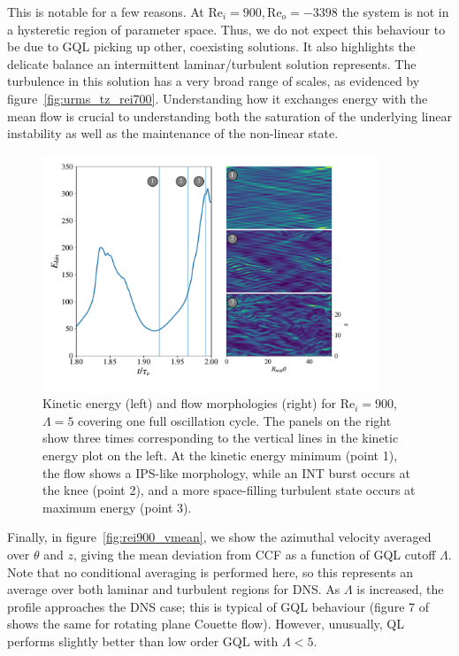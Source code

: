 \documentclass[openacc]{rstransa}%
\newcommand{\Reyn}{\mathrm{Re}}
\begin{document}
This is notable for a few reasons. At $\Reyn_i=900, \Reyn_o=-3398$ the system is not in a hysteretic region of parameter space. Thus, we do not expect this behaviour to be due to GQL picking up other, coexisting solutions. 
It also highlights the delicate balance an intermittent laminar/turbulent solution represents. The turbulence in this solution has a very broad range of scales, as evidenced by figure~\ref{fig:urms_tz_rei700}. Understanding how it exchanges energy with the mean flow is crucial to understanding both the saturation of the underlying linear instability as well as the maintenance of the non-linear state. 
\begin{figure}
    \centering
    \includegraphics[width=0.9\textwidth]{figs/rei900_story.pdf}
    \caption{Kinetic energy (left) and flow morphologies (right) for $\Reyn_i = 900$, $\Lambda = 5$ covering one full oscillation cycle. The panels on the right show three times corresponding to the vertical lines in the kinetic energy plot on the left. At the kinetic energy minimum (point 1), the flow shows a IPS-like morphology, while an INT burst occurs at the knee (point 2), and a more space-filling turbulent state occurs at maximum energy (point 3).}
    \label{fig:rei900_lambda5_story}
\end{figure}
Finally, in figure~\ref{fig:rei900_vmean}, we show the azimuthal velocity averaged over $\theta$ and $z$, giving the mean deviation from CCF as a function of GQL cutoff $\Lambda$. Note that no conditional averaging \cite{2009PhRvE..80f7301D} is performed here, so this represents an average over both laminar and turbulent regions for DNS. As $\Lambda$ is increased, the profile approaches the DNS case; this is typical of GQL behaviour (figure 7 of \cite{2017JFM...810..412T} shows the same for rotating plane Couette flow). However, unusually, QL performs slightly better than low order GQL with $\Lambda < 5$. 
\end{document}
